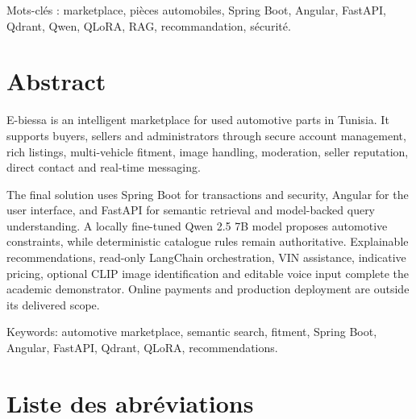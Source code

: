 Mots-clés : marketplace, pièces automobiles, Spring Boot, Angular, FastAPI, Qdrant, Qwen, QLoRA, RAG, recommandation, sécurité.


\chapter*{Abstract}

E-biessa is an intelligent marketplace for used automotive parts in Tunisia. It supports buyers, sellers and administrators through secure account management, rich listings, multi-vehicle fitment, image handling, moderation, seller reputation, direct contact and real-time messaging.


The final solution uses Spring Boot for transactions and security, Angular for the user interface, and FastAPI for semantic retrieval and model-backed query understanding. A locally fine-tuned Qwen 2.5 7B model proposes automotive constraints, while deterministic catalogue rules remain authoritative. Explainable recommendations, read-only LangChain orchestration, VIN assistance, indicative pricing, optional CLIP image identification and editable voice input complete the academic demonstrator. Online payments and production deployment are outside its delivered scope.


Keywords: automotive marketplace, semantic search, fitment, Spring Boot, Angular, FastAPI, Qdrant, QLoRA, recommendations.


\clearpage
\tableofcontents

\chapter*{Liste des abréviations}

